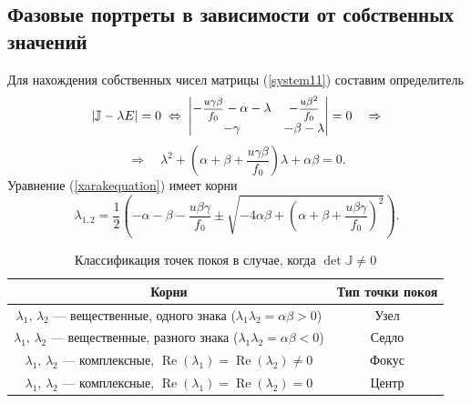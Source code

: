 \documentclass[12pt, a4paper]{article}
\begin{document}
	\subsection{Фазовые портреты в зависимости от собственных значений}
	Для нахождения собственных чисел матрицы (\ref{system11}) составим определитель
	\[
	|\mathbb{J}-\lambda E|=0 
	\;\Leftrightarrow\;
	\begin{vmatrix}
		-\hbox{\footnotesize$\displaystyle\frac{u\gamma \beta}{f_0}$}-\alpha-\lambda & -\hbox{\footnotesize$\displaystyle\frac{u\beta^2}{f_0}$} \\
		-\gamma & -\beta-\lambda
	\end{vmatrix}=0
	\quad\Rightarrow
	\]
	\begin{equation}
		\Rightarrow\quad
		\lambda^2+(\alpha+\beta+\frac{u\gamma \beta}{f_0})\lambda+\alpha \beta=0.
		\label{xarakequation}
	\end{equation}
Уравнение (\ref{xarakequation}) имеет корни
\begin{equation}
	\lambda_{1,2}=\frac{1}{2}\left(-\alpha-\beta-\frac{u\beta\gamma}{f_0}\pm\sqrt{-4\alpha\beta+\left(\alpha+\beta+\frac{u\beta\gamma}{f_0}\right)^2}\right).
\label{roots}
\end{equation}
\begin{table}[H]
	\label{tabl1}
	\centering		
	\caption{Классификация точек покоя в случае, когда $\det\mathbb{J}\ne0$}\medskip	
	\begin{tabular}{|c|c|}
		\hline
		Корни  & Тип точки покоя \\
		\hline
		$\lambda_1,\,\lambda_2$ --- вещественные, одного знака ($\lambda_1\lambda_2=\alpha\beta>0$)& Узел\\
		\hline
			$\lambda_1,\,\lambda_2$ --- вещественные, разного знака ($\lambda_1\lambda_2=\alpha\beta<0$)& Седло\\
			\hline
				$\lambda_1,\,\lambda_2$ --- комплексные, $\operatorname{Re}(\lambda_1)=\operatorname{Re}(\lambda_2)\ne0$ & Фокус\\
					\hline
				$\lambda_1,\,\lambda_2$ --- комплексные, $\operatorname{Re}(\lambda_1)=\operatorname{Re}(\lambda_2)=0$ & Центр\\
				\hline	
	\end{tabular}
\end{table}	
\end{document}
